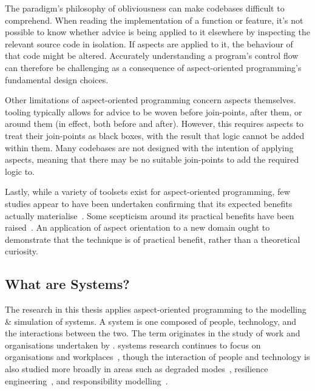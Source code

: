The paradigm's philosophy of obliviousness can make codebases difficult to
comprehend. When reading the implementation of a function or feature, it's not
possible to know whether advice is being applied to it elsewhere by inspecting
the relevant source code in isolation. If aspects are applied to it, the
behaviour of that code might be altered. Accurately understanding a program's
control flow can therefore be challenging as a consequence of aspect-oriented
programming's fundamental design choices.

Other limitations of aspect-oriented programming concern aspects themselves.
\Aspectorientation{} tooling typically allows for advice to be woven before
join-points, after them, or around them (in effect, both before and after).
However, this requires aspects to treat their join-points as black boxes, with
the result that logic cannot be added within them. Many codebases are not
designed with the intention of applying aspects, meaning that there may be no
suitable join-points to add the required logic to.

Lastly, while a variety of toolsets exist for aspect-oriented programming, few
studies appear to have been undertaken confirming that its expected benefits
actually materialise~\cite{przybylek2018empirical}. Some scepticism around its
practical benefits have been
raised~\cite{steimann06paradoxical,przybylek2010wrong,Constantinides04aopconsidered}.
An application of aspect orientation to a new domain ought to demonstrate that
the technique is of practical benefit, rather than a theoretical curiosity.



\subsection{What are \SocioTechnical Systems?}

The research in this thesis applies aspect-oriented programming to the modelling
\& simulation of \sociotechnical systems. A \sociotechnical system is one
composed of people, technology, and the interactions between the two. The
term originates in the study of work and organisations undertaken by
\citet{trist1951sociotechnical}. \Sociotechnical systems research continues to
focus on organisations and
workplaces~\cite{pasmore2019reflections,baxter2011socio}, though the interaction
of people and technology is also studied more broadly in areas such as degraded
modes~\cite{johnson2007degradedmodes}, resilience
engineering~\cite{hollnagel2006resilience}, and responsibility
modelling~\cite{lock2009responsibility}.

